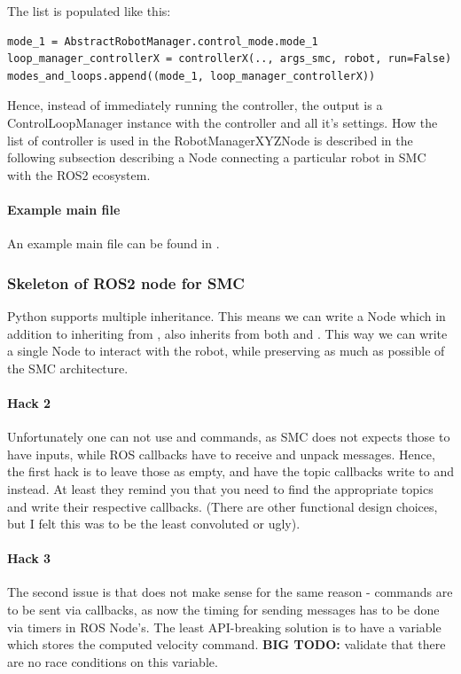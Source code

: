 The list is populated like this:
\begin{verbatim}
mode_1 = AbstractRobotManager.control_mode.mode_1
loop_manager_controllerX = controllerX(.., args_smc, robot, run=False)
modes_and_loops.append((mode_1, loop_manager_controllerX))
\end{verbatim}
Hence, instead of immediately running the controller, the output is
a ControlLoopManager instance with the controller and all it's settings.
How the list of controller is used in the RobotManagerXYZNode is described in the following subsection describing
a Node connecting a particular robot in SMC with the ROS2 ecosystem.

\paragraph{Example main file}
An example main file can be found in 
\newline
{}.

\subsubsection{Skeleton of ROS2 node for SMC}
Python supports multiple inheritance. This means
we can write a Node which in addition to inheriting from 
,
also inherits from both 
and .
This way we can write a single Node to interact with the robot,
while preserving as much as possible of the SMC architecture.

\paragraph{Hack 2}
Unfortunately one can not use 
and  commands, as SMC does not expects
those to have inputs, while ROS callbacks have to receive and unpack messages.
Hence, the first hack is to leave those as empty, and have the topic callbacks
write to  and  instead.
At least they remind you that you need to find the appropriate topics
and write their respective callbacks.
(There are other functional design choices, but I felt this was to
be the least convoluted or ugly).

\paragraph{Hack 3}
The second issue is that 
does not make sense for the same reason - commands are to be sent via callbacks,
as now the timing for sending messages has to be done via timers in ROS Node's.
The least API-breaking solution is to have a variable
 which stores the computed velocity command.
\textbf{BIG TODO:} validate that there are no race conditions
on this variable.


